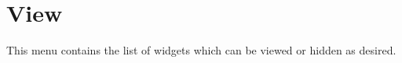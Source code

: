 
\chapter{View}




This menu contains the list of widgets which can be viewed or hidden as desired. 